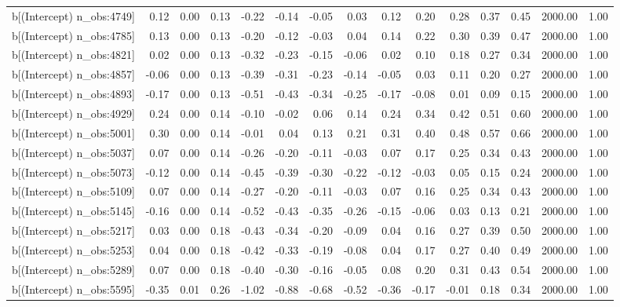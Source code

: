 \begin{table}[ht]
\begin{tabular}{rrrrrrrrrrrrrrr}
  b[(Intercept) n\_obs:4749] & 0.12 & 0.00 & 0.13 & -0.22 & -0.14 & -0.05 & 0.03 & 0.12 & 0.20 & 0.28 & 0.37 & 0.45 & 2000.00 & 1.00 \\ 
  b[(Intercept) n\_obs:4785] & 0.13 & 0.00 & 0.13 & -0.20 & -0.12 & -0.03 & 0.04 & 0.14 & 0.22 & 0.30 & 0.39 & 0.47 & 2000.00 & 1.00 \\ 
  b[(Intercept) n\_obs:4821] & 0.02 & 0.00 & 0.13 & -0.32 & -0.23 & -0.15 & -0.06 & 0.02 & 0.10 & 0.18 & 0.27 & 0.34 & 2000.00 & 1.00 \\ 
  b[(Intercept) n\_obs:4857] & -0.06 & 0.00 & 0.13 & -0.39 & -0.31 & -0.23 & -0.14 & -0.05 & 0.03 & 0.11 & 0.20 & 0.27 & 2000.00 & 1.00 \\ 
  b[(Intercept) n\_obs:4893] & -0.17 & 0.00 & 0.13 & -0.51 & -0.43 & -0.34 & -0.25 & -0.17 & -0.08 & 0.01 & 0.09 & 0.15 & 2000.00 & 1.00 \\ 
  b[(Intercept) n\_obs:4929] & 0.24 & 0.00 & 0.14 & -0.10 & -0.02 & 0.06 & 0.14 & 0.24 & 0.34 & 0.42 & 0.51 & 0.60 & 2000.00 & 1.00 \\ 
  b[(Intercept) n\_obs:5001] & 0.30 & 0.00 & 0.14 & -0.01 & 0.04 & 0.13 & 0.21 & 0.31 & 0.40 & 0.48 & 0.57 & 0.66 & 2000.00 & 1.00 \\ 
  b[(Intercept) n\_obs:5037] & 0.07 & 0.00 & 0.14 & -0.26 & -0.20 & -0.11 & -0.03 & 0.07 & 0.17 & 0.25 & 0.34 & 0.43 & 2000.00 & 1.00 \\ 
  b[(Intercept) n\_obs:5073] & -0.12 & 0.00 & 0.14 & -0.45 & -0.39 & -0.30 & -0.22 & -0.12 & -0.03 & 0.05 & 0.15 & 0.24 & 2000.00 & 1.00 \\ 
  b[(Intercept) n\_obs:5109] & 0.07 & 0.00 & 0.14 & -0.27 & -0.20 & -0.11 & -0.03 & 0.07 & 0.16 & 0.25 & 0.34 & 0.43 & 2000.00 & 1.00 \\ 
  b[(Intercept) n\_obs:5145] & -0.16 & 0.00 & 0.14 & -0.52 & -0.43 & -0.35 & -0.26 & -0.15 & -0.06 & 0.03 & 0.13 & 0.21 & 2000.00 & 1.00 \\ 
  b[(Intercept) n\_obs:5217] & 0.03 & 0.00 & 0.18 & -0.43 & -0.34 & -0.20 & -0.09 & 0.04 & 0.16 & 0.27 & 0.39 & 0.50 & 2000.00 & 1.00 \\ 
  b[(Intercept) n\_obs:5253] & 0.04 & 0.00 & 0.18 & -0.42 & -0.33 & -0.19 & -0.08 & 0.04 & 0.17 & 0.27 & 0.40 & 0.49 & 2000.00 & 1.00 \\ 
  b[(Intercept) n\_obs:5289] & 0.07 & 0.00 & 0.18 & -0.40 & -0.30 & -0.16 & -0.05 & 0.08 & 0.20 & 0.31 & 0.43 & 0.54 & 2000.00 & 1.00 \\ 
  b[(Intercept) n\_obs:5595] & -0.35 & 0.01 & 0.26 & -1.02 & -0.88 & -0.68 & -0.52 & -0.36 & -0.17 & -0.01 & 0.18 & 0.34 & 2000.00 & 1.00 \\ 

\end{tabular}
\end{table}
